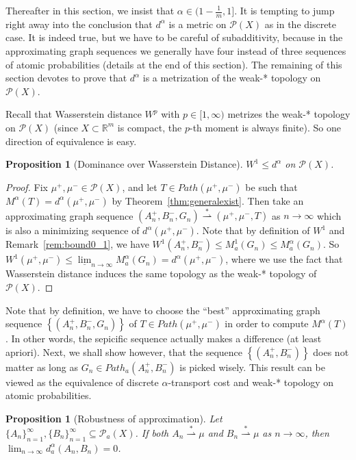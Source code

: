 \documentclass[fleqn]{article}
\newtheorem{prop}[thm]{Proposition}
\theoremstyle{definition}
\theoremstyle{remark}
\newcommand{\linf}[1][n]{\underline{\lim}_{#1\rightarrow\infty}} %
\renewcommand{\l}[1][n]{\lim_{#1\rightarrow\infty}} %
\renewcommand{\P}{\mathcal{P}} %
\newcommand{\wstar}{\stackrel{*}{\rightharpoonup}} %
\begin{document}
\par
Thereafter in this section, we insist that $\alpha\in(1-\frac{1}{m},1]$. It is tempting to jump right away into the conclusion that $d^\alpha$ is a metric on $\P(X)$ as in the discrete case. It is indeed true, but we have to be careful of subadditivity, because in the approximating graph sequences we generally have four instead of three sequences of atomic probabilities (details at the end of this section). The remaining of this section devotes to prove that $d^\alpha$ is a metrization of the weak-* topology on $\P(X)$.
\par
Recall that Wasserstein distance $W^p$ with $p\in[1,\infty)$ metrizes the weak-* topology on $\P(X)$ (since $X\subset\mathbb{R}^m$ is compact, the $p$-th moment is always finite). So one direction of equivalence is easy.
\begin{prop}[Dominance over Wasserstein Distance]
$W^1 \le d^\alpha$ on $\P(X)$.
\end{prop}

\begin{proof}
Fix $\mu^+,\mu^- \in\P(X)$, and let $T\in Path(\mu^+,\mu^-)$ be such that $M^\alpha(T)=d^\alpha(\mu^+,\mu^-)$ by Theorem~\ref{thm:generalexist}. Then take an approximating graph sequence $(A_n^+,B_n^-,G_n)\wstar(\mu^+,\mu^-,T)$ as $n\rightarrow \infty$ which is also a minimizing sequence of $d^\alpha(\mu^+,\mu^-)$. Note that by definition of $W^1$ and Remark~\ref{rem:bound0_1}, we have $W^1(A_n^+,B_n^-) \le M_a^1(G_n) \le M_a^\alpha(G_n)$. So $W^1(\mu^+,\mu^-) \le \linf M_a^\alpha(G_n) = d^\alpha(\mu^+,\mu^-)$, where we use the fact that Wasserstein distance induces the same topology as the weak-* topology of $\P(X)$.
\end{proof}

\par
Note that by definition, we have to choose the ``best'' approximating graph sequence $\left\{(A_n^+,B_n^-,G_n)\right\}$ of $T\in Path(\mu^+,\mu^-)$ in order to compute $M^\alpha(T)$. In other words, the sepicific sequence actually makes a difference (at least apriori). Next, we shall show however, that the sequence $\left\{(A_n^+,B_n^-)\right\}$ does not matter as long as $G_n\in Path_a(A_n^+,B_n^-)$ is picked wisely. This result can be viewed as the equivalence of discrete $\alpha$-transport cost and weak-* topology on atomic probabilities.
\begin{prop}[Robustness of approximation]
Let $\{A_n\}_{n=1}^\infty, \{B_n\}_{n=1}^\infty \subseteq \P_a(X)$. If both $A_n \wstar \mu$ and $B_n \wstar \mu$ as $n \rightarrow \infty$, then $\l d_a^\alpha(A_n,B_n)=0$.
\end{prop}
\end{document}
